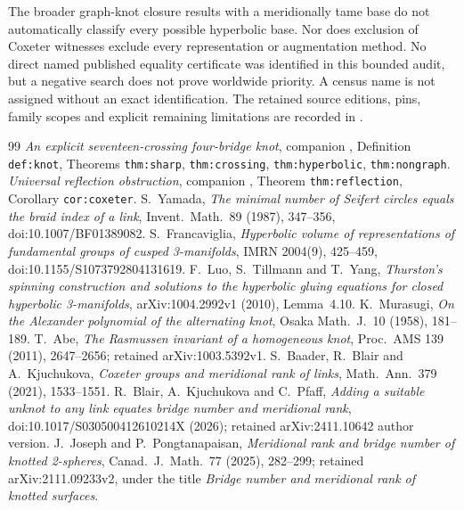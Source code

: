 \documentclass[11pt]{article}
\begin{document}
The broader graph-knot closure results with a meridionally
tame base \cite[Theorem~1 and Corollary~1]{bdjw}
do not automatically classify every possible hyperbolic base.
Nor does exclusion of Coxeter witnesses
exclude every representation or augmentation method.
No direct named published equality certificate was identified
in this bounded audit, but a negative search does not prove
worldwide priority. A census name is not assigned without an
exact identification. The retained source editions, pins,
family scopes and explicit remaining limitations are recorded
in .

\begin{thebibliography}{99}\small
{} \emph{An explicit seventeen-crossing four-bridge knot},
companion ,
Definition \texttt{def:knot}, Theorems
\texttt{thm:sharp}, \texttt{thm:crossing},
\texttt{thm:hyperbolic}, \texttt{thm:nongraph}.
 \emph{Universal reflection obstruction},
companion ,
Theorem \texttt{thm:reflection}, Corollary \texttt{cor:coxeter}.
 S.~Yamada, \emph{The minimal number of Seifert
circles equals the braid index of a link}, Invent.\ Math.\
89 (1987), 347--356, doi:10.1007/BF01389082.
 S.~Francaviglia, \emph{Hyperbolic volume of
representations of fundamental groups of cusped 3-manifolds},
IMRN 2004(9), 425--459, doi:10.1155/S1073792804131619.
 F.~Luo, S.~Tillmann and T.~Yang,
\emph{Thurston's spinning construction and solutions to the
hyperbolic gluing equations for closed hyperbolic 3-manifolds},
arXiv:1004.2992v1 (2010), Lemma~4.10.
 K.~Murasugi, \emph{On the Alexander polynomial
of the alternating knot}, Osaka Math.\ J.\ 10 (1958), 181--189.
 T.~Abe, \emph{The Rasmussen invariant of a homogeneous
knot}, Proc.\ AMS 139 (2011), 2647--2656; retained arXiv:1003.5392v1.
\bibitem{bbk} S.~Baader, R.~Blair and A.~Kjuchukova,
\emph{Coxeter groups and meridional rank of links},
Math.\ Ann.\ 379 (2021), 1533--1551.
 R.~Blair, A.~Kjuchukova and C.~Pfaff,
\emph{Adding a suitable unknot to any link equates bridge number
and meridional rank}, doi:10.1017/S030500412610214X (2026);
retained arXiv:2411.10642 author version.
 J.~Joseph and P.~Pongtanapaisan, \emph{Meridional
rank and bridge number of knotted 2-spheres},
Canad.\ J.\ Math.\ 77 (2025), 282--299; retained arXiv:2111.09233v2,
under the title \emph{Bridge number and meridional rank of knotted
surfaces}.

\end{thebibliography}
\end{document}
